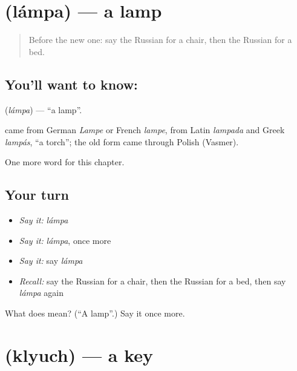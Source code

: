 \section[\texorpdfstring{\ru{лампа} (lámpa)}{лампа (lámpa)}]{ (lámpa) — a lamp}

\label{lesson:RU-C49-lamp}



\begin{quote}
Before the new one: say the Russian for a chair, then the Russian for a bed.
\end{quote}

\subsection*{You'll want to know: }
\textbf{} (\emph{lámpa}) — \textquotedblleft{}a lamp\textquotedblright{}.

\begin{cousinweb}
\textbf{} came from German \emph{Lampe} or French \emph{lampe}, from Latin \emph{lampada} and Greek \emph{lampás}, \textquotedblleft{}a torch\textquotedblright{}; the old form \emph{} came through Polish (Vasmer).
\end{cousinweb}

\begin{grammarlens}[title={What you've built}]
One more word for this chapter.
\end{grammarlens}

\subsection*{Your turn}
\begin{itemize}
\raggedright
  \item \emph{Say it:} \emph{lámpa}
  \item \emph{Say it:} \emph{lámpa}, once more
  \item \emph{Say it:} say \emph{lámpa}
  \item \emph{Recall:} say the Russian for a chair, then the Russian for a bed, then say \emph{lámpa} again
\end{itemize}

\begin{tcolorbox}[breakable,colback=teal!4,colframe=teal!35!black,title={Before you move on}]
What does  mean? (\textquotedblleft{}A lamp\textquotedblright{}.) Say it once more.
\end{tcolorbox}
\section[\texorpdfstring{\ru{ключ} (klyuch)}{ключ (klyuch)}]{ (klyuch) — a key}

